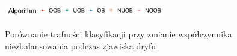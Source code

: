 \begin{figure}[h]
    \centering
    \includegraphics[width=7cm]{figures/algorithms_legend.JPG}
\end{figure}

\vspace{-1.2cm}

\begin{figure}[h]
    \centering
    \qquad
    \caption{Porównanie trafności klasyfikacji przy zmianie współczynnika niezbalansowania podczas zjawiska dryfu}\label{Figure:DriftImbalance}
\end{figure}

